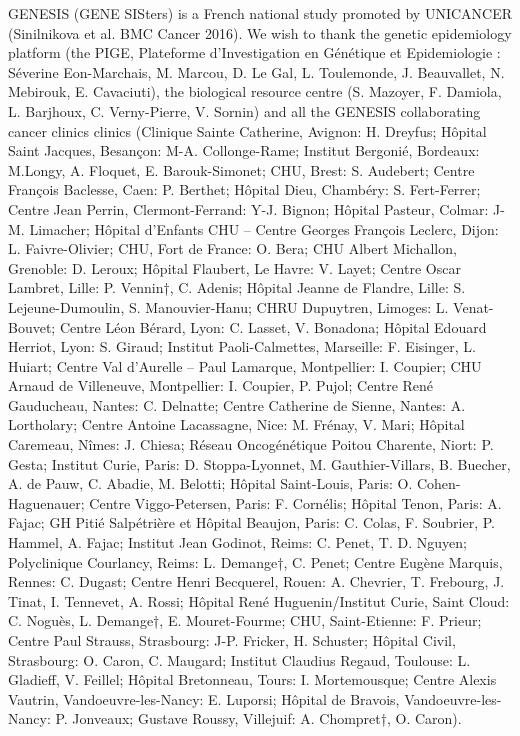 \documentclass[twocolumn, 10pt]{article}
\begin{document}
GENESIS (GENE SISters) is a French national study promoted by UNICANCER (Sinilnikova et al. BMC Cancer 2016). We wish to thank the genetic epidemiology platform (the PIGE, Plateforme d'Investigation en Génétique et Epidemiologie : Séverine Eon-Marchais, M. Marcou, D. Le Gal, L. Toulemonde, J. Beauvallet, N. Mebirouk, E. Cavaciuti), the biological resource centre (S. Mazoyer, F. Damiola, L. Barjhoux, C. Verny-Pierre, V. Sornin) and all the GENESIS collaborating cancer clinics clinics (Clinique Sainte Catherine, Avignon: H. Dreyfus; Hôpital Saint Jacques, Besançon: M-A. Collonge-Rame; Institut Bergonié, Bordeaux: M.Longy, A. Floquet, E. Barouk-Simonet; CHU, Brest: S. Audebert; Centre François Baclesse, Caen: P. Berthet; Hôpital Dieu, Chambéry: S. Fert-Ferrer; Centre Jean Perrin, Clermont-Ferrand: Y-J. Bignon; Hôpital Pasteur, Colmar: J-M. Limacher; Hôpital d’Enfants CHU – Centre Georges François Leclerc, Dijon: L. Faivre-Olivier; CHU, Fort de France: O. Bera; CHU Albert Michallon, Grenoble: D. Leroux; Hôpital Flaubert, Le Havre: V. Layet; Centre Oscar Lambret, Lille: P. Vennin†, C. Adenis; Hôpital Jeanne de Flandre, Lille: S. Lejeune-Dumoulin, S. Manouvier-Hanu; CHRU Dupuytren, Limoges: L. Venat-Bouvet; Centre Léon Bérard, Lyon: C. Lasset, V. Bonadona; Hôpital Edouard Herriot, Lyon: S. Giraud; Institut Paoli-Calmettes, Marseille: F. Eisinger, L. Huiart; Centre Val d’Aurelle – Paul Lamarque, Montpellier: I. Coupier; CHU Arnaud de Villeneuve, Montpellier: I. Coupier, P. Pujol; Centre René Gauducheau, Nantes: C. Delnatte; Centre Catherine de Sienne, Nantes: A. Lortholary; Centre Antoine Lacassagne, Nice: M. Frénay, V. Mari; Hôpital Caremeau, Nîmes: J. Chiesa; Réseau Oncogénétique Poitou Charente, Niort: P. Gesta; Institut Curie, Paris: D. Stoppa-Lyonnet, M. Gauthier-Villars, B. Buecher, A. de Pauw, C. Abadie, M. Belotti; Hôpital Saint-Louis, Paris: O. Cohen-Haguenauer; Centre Viggo-Petersen, Paris: F. Cornélis; Hôpital Tenon, Paris: A. Fajac; GH Pitié Salpétrière et Hôpital Beaujon, Paris: C. Colas, F. Soubrier, P. Hammel, A. Fajac; Institut Jean Godinot, Reims: C. Penet, T. D. Nguyen; Polyclinique Courlancy, Reims: L. Demange†, C. Penet; Centre Eugène Marquis, Rennes: C. Dugast; Centre Henri Becquerel, Rouen: A. Chevrier, T. Frebourg, J. Tinat, I. Tennevet, A. Rossi; Hôpital René Huguenin/Institut Curie, Saint Cloud: C. Noguès, L. Demange†, E. Mouret-Fourme; CHU, Saint-Etienne: F. Prieur; Centre Paul Strauss, Strasbourg: J-P. Fricker, H. Schuster; Hôpital Civil, Strasbourg: O. Caron, C. Maugard; Institut Claudius Regaud, Toulouse: L. Gladieff, V. Feillel; Hôpital Bretonneau, Tours: I. Mortemousque; Centre Alexis Vautrin, Vandoeuvre-les-Nancy: E. Luporsi; Hôpital de Bravois, Vandoeuvre-les-Nancy: P. Jonveaux; Gustave Roussy, Villejuif: A. Chompret†, O. Caron). 
\end{document}
